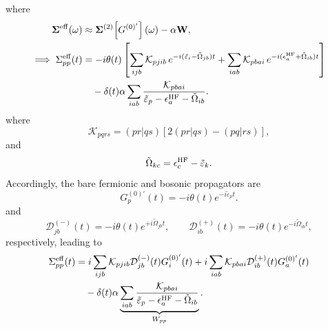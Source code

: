 where
\begin{align}
\bm{\Sigma}^{\mathrm{eff}}(\omega)
&\approx
\bm{\Sigma}^{(2)}\!\left[G^{(0)'}\right](\omega)
-\alpha\mathbf W,
\\
\implies
\Sigma_{pp}^{\mathrm{eff}}(t)
&=
-i\theta(t)
\left[
\sum_{ijb}
\mathcal K_{pjib}\,
e^{-i(\tilde\varepsilon_i-\tilde\Omega_{jb})t}
+
\sum_{iab}
\mathcal K_{pbai}\,
e^{-i(\epsilon_a^{\rm HF}+\tilde\Omega_{ib})t}
\right]
\nonumber\\
&\quad
-\delta(t)\alpha
\sum_{iab}
\frac{
\mathcal K_{pbai}
}{
\tilde\varepsilon_p
-\epsilon_a^{\rm HF}
-\tilde\Omega_{ib}
}.
\end{align}
where
$$
\mathcal K_{pqrs}
=
(pr|qs)
\left[
2(pr|qs)-(pq|rs)
\right],
$$
and
$$
\tilde\Omega_{kc}
=
\epsilon_c^{\rm HF}
-\tilde\varepsilon_k.
$$
Accordingly, the bare fermionic and bosonic propagators are
\begin{equation}
G_p^{(0)'}(t)
=
-i\theta(t)e^{-i\tilde{\varepsilon}_p t}.
\end{equation}
and
\begin{equation}
\mathcal{D}_{jb}^{(-)}(t)
=
-i\theta(t)
e^{+i\tilde{\Omega}_{jb}t},
\qquad
\mathcal{D}_{ib}^{(+)}(t)
=
-i\theta(t)
e^{-i\tilde{\Omega}_{ib}t},
\end{equation}
respectively, leading to
\begin{align}
\Sigma_{pp}^{\mathrm{eff}}(t)
&=
i
\sum_{ijb}
\mathcal{K}_{pjib}
\mathcal{D}_{jb}^{(-)}(t)
G_i^{(0)'}(t)
+
i
\sum_{iab}
\mathcal{K}_{pbai}
\mathcal{D}_{ib}^{(+)}(t)
G_a^{(0)'}(t)\nonumber\\
&\quad - \delta(t)\alpha
\underbrace{\sum_{iab}
\frac{\mathcal K_{pbai}
}{\tilde\varepsilon_p
-\epsilon_a^{\rm HF}
-\tilde\Omega_{ib}}}_{W_{pp}}.
\end{align}

